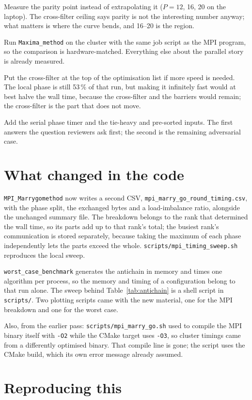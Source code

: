\documentclass[11pt,a4paper]{article}
\newcommand{\code}[1]{\texttt{#1}}
\begin{document}
Measure the parity point instead of extrapolating it ($P=12$, 16, 20 on the
laptop). The cross-filter ceiling says parity is not the interesting number
anyway; what matters is where the curve bends, and 16--20 is the region.

Run \code{Maxima\_method} on the cluster with the same job script as the MPI
program, so the comparison is hardware-matched. Everything else about the
parallel story is already measured.

Put the cross-filter at the top of the optimisation list if more speed is
needed. The local phase is still 53\,\% of that run, but making it infinitely
fast would at best halve the wall time, because the cross-filter and the
barriers would remain; the cross-filter is the part that does not move.

Add the serial phase timer and the tie-heavy and pre-sorted inputs. The first
answers the question reviewers ask first; the second is the remaining
adversarial case.

\section{What changed in the code}

\code{MPI\_Marrygomethod} now writes a second CSV,
\code{mpi\_marry\_go\_round\_timing.csv}, with the phase split, the exchanged
bytes and a load-imbalance ratio, alongside the unchanged summary file. The
breakdown belongs to the rank that determined the wall time, so its parts add up
to that rank's total; the busiest rank's communication is stored separately,
because taking the maximum of each phase independently lets the parts exceed the
whole. \code{scripts/mpi\_timing\_sweep.sh} reproduces the local sweep.

\code{worst\_case\_benchmark} generates the antichain in memory and times one
algorithm per process, so the memory and timing of a configuration belong to
that run alone. The sweep behind Table~\ref{tab:antichain} is a shell script in
\code{scripts/}. Two plotting scripts came with the new material, one for the
MPI breakdown and one for the worst case.

Also, from the earlier pass: \code{scripts/mpi\_marry\_go.sh} used to compile the
MPI binary itself with \code{-O2} while the CMake target uses \code{-O3}, so
cluster timings came from a differently optimised binary. That compile line is
gone; the script uses the CMake build, which its own error message already
assumed.

\section{Reproducing this}
\end{document}
